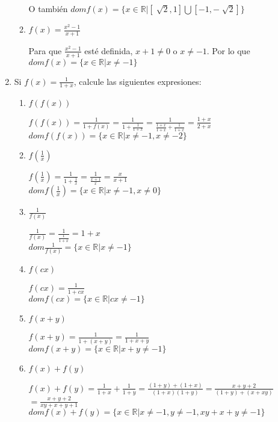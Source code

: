 \documentclass[11pt, a4paper]{article}
\begin{document}
\begin{enumerate}
\begin{enumerate}
            O también $dom f(x)= \{x \in \mathbb{R} | [\sqrt[]{2}, 1] \bigcup [-1, -\sqrt[]{2}]\}$

            \item $f(x)=\frac{x^2-1}{x+1}$
            
            Para que $\frac{x^2-1}{x+1}$ esté definida, $x+1 \neq 0$ o $x \neq -1$. Por lo que
            $dom f(x)= \{x \in \mathbb{R} | x \neq -1 \} $
        \end{enumerate}
    \item Si $f(x)= \frac{1}{1+x}$, calcule las siguientes expresiones:
        \begin{enumerate}
            \item $f(f(x))$
            
            $f(f(x)) = \frac{1}{1+f(x)}=\frac{1}{1+\frac{1}{1+x}}=\frac{1}{\frac{1+x}{1+x}+\frac{1}{1+x}}=\frac{1+x}{2+x}$\\
            $dom f(f(x))= \{x \in \mathbb{R} | x\neq -1,x\neq -2\}$

            \item $f(\frac{1}{x})$
            
            $f(\frac{1}{x})= \frac{1}{1+\frac{1}{x}}=\frac{1}{\frac{x+1}{x}}=\frac{x}{x+1}$\\
            $dom f(\frac{1}{x})= \{x\in \mathbb{R}| x \neq -1, x \neq 0\}$

            \item $\frac{1}{f(x)}$
            
            $\frac{1}{f(x)}=\frac{1}{\frac{1}{1+x}}=1+x$\\
            $dom \frac{1}{f(x)}= \{x \in \mathbb{R}| x \neq -1\}$

            \item $f(cx)$
            
            $f(cx)= \frac{1}{1+cx}$\\
            $dom f(cx)= \{x \in \mathbb{R}| cx \neq -1\}$

            \item $f(x+y)$
            
            $f(x+y)= \frac{1}{1+(x+y)}= \frac{1}{1+x+y}$\\
            $dom f(x+y)= \{x \in \mathbb{R}| x+y\neq -1\}$

            \item $f(x) + f(y)$
            
            $f(x)+f(y)=\frac{1}{1+x} + \frac{1}{1+y}=\frac{(1+y)+(1+x)}{(1+x)(1+y)}=\frac{x+y+2}{(1+y)+(x+xy)}$\\
            $=\frac{x+y+2}{xy + x + y + 1}$
            $dom f(x)+f(y)= \{x \in \mathbb{R}| x \neq -1, y \neq -1, xy + x + y \neq -1\}$


\end{enumerate}
\end{enumerate}
\end{document}
